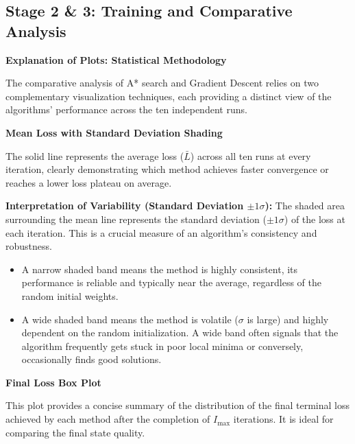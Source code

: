 
\subsection{Stage 2 \& 3: Training and Comparative Analysis}


\noindent \textbf{Explanation of Plots: Statistical Methodology}

\noindent The comparative analysis of A* search and Gradient Descent relies on two complementary visualization techniques, each providing a distinct view of the algorithms' performance across the ten independent runs.

\noindent \textbf{Mean Loss with Standard Deviation Shading}

\noindent The solid line represents the average loss ($\bar{L}$) across all ten runs at every iteration, clearly demonstrating which method achieves faster convergence or reaches a lower loss plateau on average.

\noindent \textbf{Interpretation of Variability (Standard Deviation $\pm 1\sigma$):} The shaded area surrounding the mean line represents the standard deviation ($\pm 1\sigma$) of the loss at each iteration. This is a crucial measure of an algorithm's consistency and robustness.
\begin{itemize}
    \item A narrow shaded band means the method is highly consistent, its performance is reliable and typically near the average, regardless of the random initial weights.
    \item A wide shaded band means the method is volatile ($\sigma$ is large) and highly dependent on the random initialization. A wide band often signals that the algorithm frequently gets stuck in poor local minima or conversely, occasionally finds good solutions.
\end{itemize}

\newpage
\noindent \textbf{Final Loss Box Plot}

\noindent This plot provides a concise summary of the distribution of the final terminal loss achieved by each method after the completion of $I_{\text{max}}$ iterations. It is ideal for comparing the final state quality.

